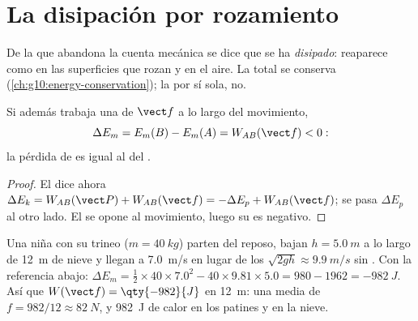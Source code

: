 \section{La disipación por rozamiento}

\begin{definition}[Disipación]\label{def:g11:mechanical-energy:dissipation}
De la  que abandona la cuenta mecánica se dice que se ha
\emph{disipado}: reaparece como  en las
superficies que rozan y en el aire. La  total se conserva
(\cref{ch:g10:energy-conservation}); la  por sí sola,
no.
\end{definition}

\begin{proposition}\label{prop:g11:mechanical-energy:deficit}
Si además trabaja una  de  $\vect f$ a lo largo del
movimiento,
\[
\Delta E_m = E_m(B) - E_m(A) = W_{AB}(\vect f) < 0:
\]
la pérdida de  es igual al  del .
\end{proposition}

\begin{proof}
El  dice ahora
$\Delta E_k = W_{AB}(\vect P) + W_{AB}(\vect f) = -\Delta E_p +
W_{AB}(\vect f)$; se pasa $\Delta E_p$ al otro lado. El  se
opone al movimiento, luego su  es negativo.
\end{proof}

\begin{example}\label{ex:g11:mechanical-energy:toboggan}
Una niña con su trineo ($m = \qty{40}{kg}$) parten del reposo, bajan
$h = \qty{5.0}{m}$ a lo largo de \qty{12}{m} de nieve y llegan a
\qty{7.0}{m/s} en lugar de los $\sqrt{2gh} \approx \qty{9.9}{m/s}$ sin
. Con la referencia abajo:
$\Delta E_m = \tfrac12 \times 40 \times 7.0^2 - 40 \times 9.81
\times 5.0 = 980 - 1962 = \qty{-982}{J}$. Así que
$W(\vect f) = \qty{-982}{J}$ en \qty{12}{m}: una  media de
 $f = 982/12 \approx \qty{82}{N}$, y \qty{982}{J} de calor en
los patines y en la nieve.
\end{example}

